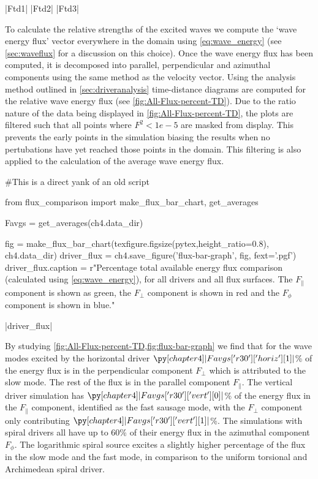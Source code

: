 \py[chapter4]|Ftd1|
\py[chapter4]|Ftd2|
\py[chapter4]|Ftd3|

To calculate the relative strengths of the excited waves we compute the `wave energy flux' vector everywhere in the domain using \cref{eq:wave_energy} (see \cref{sec:waveflux} for a discussion on this choice).
Once the wave energy flux has been computed, it is decomposed into parallel, perpendicular and azimuthal components using the same method as the velocity vector. 
Using the analysis method outlined in \cref{sec:driveranalysis} time-distance diagrams are computed for the relative wave energy flux (see \cref{fig:All-Flux-percent-TD}). 
Due to the ratio nature of the data being displayed in \cref{fig:All-Flux-percent-TD}, the plots are filtered such that all points where $F^2 < 1e-5$ are masked from display.
This prevents the early points in the simulation biasing the results when no pertubations have yet reached those points in the domain.
This filtering is also applied to the calculation of the average wave energy flux.


\begin{pycode}[chapter4]
#This is a direct yank of an old script

from flux_comparison import make_flux_bar_chart, get_averages

Favgs = get_averages(ch4.data_dir)

fig = make_flux_bar_chart(texfigure.figsize(pytex,height_ratio=0.8), ch4.data_dir)
driver_flux = ch4.save_figure('flux-bar-graph', fig, fext='.pgf')
driver_flux.caption = r"Percentage total available energy flux comparison (calculated using \cref{eq:wave_energy}), for all drivers and all flux surfaces. The $F_\parallel$ component is shown as green, the $F_\perp$ component is shown in red and the $F_\phi$ component is shown in blue."
\end{pycode}

\py[chapter4]|driver_flux|


By studying \cref{fig:All-Flux-percent-TD,fig:flux-bar-graph} we find that for the wave modes excited by the horizontal driver $\py[chapter4]|Favgs['r30']['horiz'][1]|$\% of the energy flux is in the perpendicular component $F_\perp$ which is attributed to the slow mode.
The rest of the flux is in the parallel component $F_\parallel$. 
The vertical driver simulation has $\py[chapter4]|Favgs['r30']['vert'][0]|$\% of the energy flux in the $F_\parallel$ component, identified as the fast sausage mode, with the $F_\perp$ component only contributing $\py[chapter4]|Favgs['r30']['vert'][1]|$\%. 
The simulations with spiral drivers all have up to $60$\% of their energy flux in the azimuthal component $F_\phi$. 
The logarithmic spiral source excites a slightly higher percentage of the flux in the slow mode and the fast mode, in comparison to the uniform torsional and Archimedean spiral driver.

